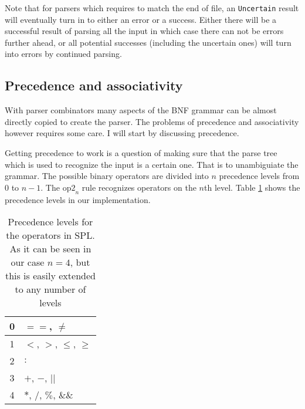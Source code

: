 \documentclass{scrartcl}
\begin{document}
Note that for parsers which requires to match the end of file, an
\lstinline{Uncertain} result will eventually turn in to either an
error or a success. Either there will be a successful result of
parsing all the input in which case there can not be errors further
ahead, or all potential successes (including the uncertain ones) will
turn into errors by continued parsing.

\subsection{Precedence and associativity}

With parser combinators many aspects of the BNF grammar can be
almost directly copied to create the parser. The problems of 
precedence and associativity however requires some care. I will start
by discussing precedence.

Getting precedence to work is a question of making
sure that the parse tree which is used to recognize the input is
a certain one. That is to unambiguiate the grammar. The possible
binary operators are divided into $n$ precedence levels 
from $0$ to $n-1$. The
$\text{op2}_n$ rule recognizes operators on the $n$th level. Table
\ref{tab:precedence} shows the precedence levels in our implementation.

\begin{table}
\centering
\begin{tabular}{| c | l | }
\hline
0 & $==$, $\neq$ \\
\hline
1 & $<$, $>$, $\leq$, $\geq$ \\
\hline
2 & $:$ \\
\hline
3 & $+$, $-$, $||$ \\
\hline
4 & $*$, $/$, $\%$, $\&\&$ \\
\hline
\end{tabular}
\caption{Precedence levels for the operators in SPL. As it can be seen
 in our case $n=4$, but this is easily extended to any number of
levels}
\label{tab:precedence}
\end{table}
\end{document}
